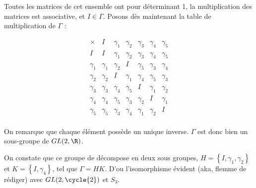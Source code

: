 Toutes les matrices de cet ensemble ont pour déterminant 1, la multiplication des matrices est associative, et $I \in \Gamma$. Posons dès maintenant la table de multiplication de $\Gamma$ :


\[
  \begin{array}{c|cccccc}
    \times   & I        & \gamma_1 & \gamma_2 & \gamma_3 & \gamma_4 & \gamma_5 \\
    \hline
    I        & I        & \gamma_1 & \gamma_2 & \gamma_3 & \gamma_4 & \gamma_5 \\
    \gamma_1 & \gamma_1 & \gamma_2 & I        & \gamma_5 & \gamma_3 & \gamma_4 \\
    \gamma_2 & \gamma_2 & I        & \gamma_1 & \gamma_4 & \gamma_5 & \gamma_3 \\
    \gamma_3 & \gamma_3 & \gamma_4 & \gamma_5 & I        & \gamma_1 & \gamma_2 \\
    \gamma_4 & \gamma_4 & \gamma_5 & \gamma_3 & \gamma_2 & I        & \gamma_1 \\
    \gamma_5 & \gamma_5 & \gamma_3 & \gamma_4 & \gamma_1 & \gamma_2 & I        \\

  \end{array}
\]

On remarque que chaque élément possède un unique inverse. $\Gamma$ est donc bien un sous-groupe de $GL(2,\R)$.

On constate que ce groupe de décompose en deux sous groupes, $H = \left\{I, \gamma_1, \gamma_2 \right\}$ et $K = \left\{ I, \gamma_4  \right\}$, tel que $\Gamma = HK$. 
D'ou l'isomorphisme évident (aka, flemme de rédiger) avec $GL(2,\cycle{2})$ et $S_3$.